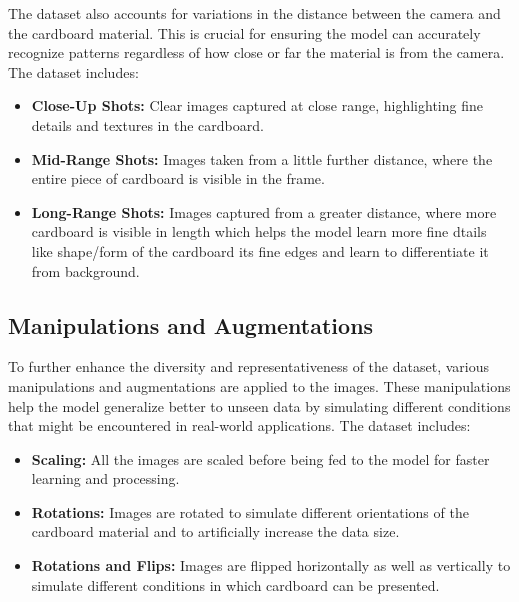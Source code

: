 The dataset also accounts for variations in the distance between the camera and the cardboard material. This is crucial for ensuring the model can accurately recognize patterns regardless of how close or far the material is from the camera. The dataset includes:


\begin{itemize}
	\item \textbf{Close-Up Shots:} Clear images captured at close range, highlighting fine details and textures in the cardboard.
	\item \textbf{Mid-Range Shots:} Images taken from a little further distance, where the entire piece of cardboard is visible in the frame.
	\item \textbf{Long-Range Shots:} Images captured from a greater distance, where more cardboard is visible in length which helps the model learn more fine dtails like shape/form of the cardboard its fine edges and learn to differentiate it from background.
\end{itemize}



\subsection{Manipulations and Augmentations}

To further enhance the diversity and representativeness of the dataset, various manipulations and augmentations are applied to the images. These manipulations help the model generalize better to unseen data by simulating different conditions that might be encountered in real-world applications. The dataset includes:

\begin{itemize}
	\item \textbf{Scaling:} All the images are scaled before being fed to the model for faster learning and processing.
	
\end{itemize}
\begin{itemize}
	\item \textbf{Rotations:} Images are rotated to simulate different orientations of the cardboard material and to artificially increase the data size.
	
\end{itemize}
\begin{itemize}
	\item \textbf{Rotations and Flips:} Images are flipped horizontally as well as vertically to simulate different conditions in which cardboard can be presented.
	
\end{itemize}




